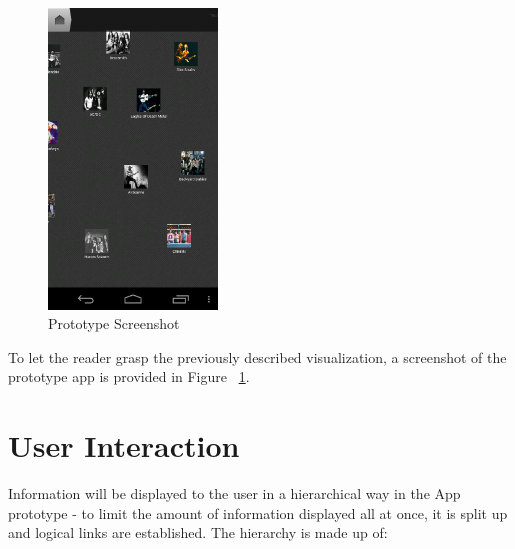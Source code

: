 \begin{figure}[H]
  \centering
    \includegraphics[width=0.4\textwidth]{figures/screen_mds_10_after_all_uncollided_nodes}
  \caption{Prototype Screenshot}
  \label{fig:prototype_screenshot}
\end{figure}

To let the reader grasp the previously described visualization, a screenshot of the prototype app is provided in Figure ~\ref{fig:prototype_screenshot}.

\section{User Interaction}

Information will be displayed to the user in a hierarchical way in the App prototype - to limit the amount of information displayed all at once, it is split up and logical links are established. The hierarchy is made up of:

